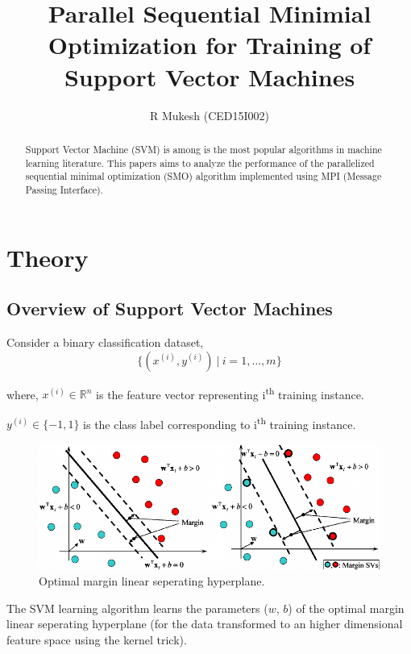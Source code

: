 \documentclass{article}
\title{Parallel Sequential Minimial Optimization for Training of Support Vector Machines}
\author{R Mukesh (CED15I002)}
\affil{IIITDM Kancheepuram}
\date{}
\newcommand{\R}{\mathbb{R}}
\begin{document}
\maketitle

\begin{abstract}
	Support Vector Machine (SVM) is among is the most popular algorithms in machine learning literature. This papers aims to analyze the performance of the parallelized sequential minimal optimization (SMO) algorithm implemented using MPI (Message Passing Interface).
\end{abstract}

\section{Theory}

	\subsection{Overview of Support Vector Machines}
	
		Consider a binary classification dataset,
			\[
				\{(x^{(i)}, y^{(i)})\ |\ i=1, \ldots, m\}
			\]			
		
		where, 	$x^{(i)} \in \R^n$ is the feature vector representing i\textsuperscript{th} training instance.\par
		\hspace{32pt}$y^{(i)} \in \{-1, 1\}$ is the class label corresponding to i\textsuperscript{th} training instance.\par
		
		\begin{figure}[!htbp]
			\centering
			\includegraphics[scale=0.4]{svm}
			\caption{Optimal margin linear seperating hyperplane.}
		\end{figure}
		
		The SVM learning algorithm learns the parameters ($w$, $b$) of the optimal margin linear seperating hyperplane (for the data transformed to an higher dimensional feature space using the kernel trick).
		
\end{document}
